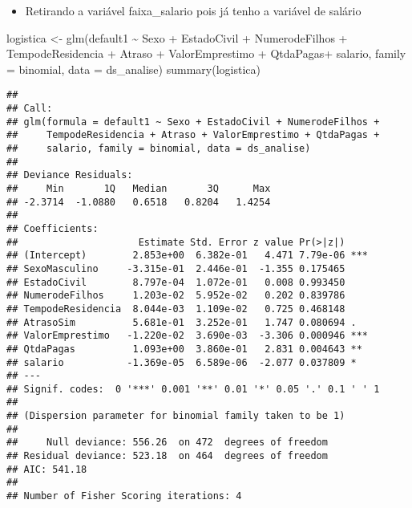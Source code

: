 \documentclass[
]{article}
\newenvironment{Shaded}{\begin{snugshade}}{\end{snugshade}}
\newcommand{\AttributeTok}[1]{\textcolor[rgb]{0.77,0.63,0.00}{#1}}
\newcommand{\FunctionTok}[1]{\textcolor[rgb]{0.00,0.00,0.00}{#1}}
\newcommand{\NormalTok}[1]{#1}
\newcommand{\OtherTok}[1]{\textcolor[rgb]{0.56,0.35,0.01}{#1}}
\newcommand{\SpecialCharTok}[1]{\textcolor[rgb]{0.00,0.00,0.00}{#1}}
\providecommand{\tightlist}{%
  \setlength{\itemsep}{0pt}\setlength{\parskip}{0pt}}
\begin{document}
\begin{itemize}
\tightlist
\item
  Retirando a variável faixa\_salario pois já tenho a variável de
  salário
\end{itemize}

\begin{Shaded}
\begin{Highlighting}[]
\NormalTok{logistica }\OtherTok{\textless{}{-}} \FunctionTok{glm}\NormalTok{(default1 }\SpecialCharTok{\textasciitilde{}}\NormalTok{ Sexo }\SpecialCharTok{+} 
\NormalTok{                            EstadoCivil }\SpecialCharTok{+} 
\NormalTok{                            NumerodeFilhos }\SpecialCharTok{+} 
\NormalTok{                            TempodeResidencia }\SpecialCharTok{+}
\NormalTok{                            Atraso }\SpecialCharTok{+} 
\NormalTok{                            ValorEmprestimo }\SpecialCharTok{+}
\NormalTok{                            QtdaPagas}\SpecialCharTok{+} 
\NormalTok{                            salario, }\AttributeTok{family =}\NormalTok{ binomial, }\AttributeTok{data =}\NormalTok{ ds\_analise)}
\FunctionTok{summary}\NormalTok{(logistica)}
\end{Highlighting}
\end{Shaded}

\begin{verbatim}
## 
## Call:
## glm(formula = default1 ~ Sexo + EstadoCivil + NumerodeFilhos + 
##     TempodeResidencia + Atraso + ValorEmprestimo + QtdaPagas + 
##     salario, family = binomial, data = ds_analise)
## 
## Deviance Residuals: 
##     Min       1Q   Median       3Q      Max  
## -2.3714  -1.0880   0.6518   0.8204   1.4254  
## 
## Coefficients:
##                     Estimate Std. Error z value Pr(>|z|)    
## (Intercept)        2.853e+00  6.382e-01   4.471 7.79e-06 ***
## SexoMasculino     -3.315e-01  2.446e-01  -1.355 0.175465    
## EstadoCivil        8.797e-04  1.072e-01   0.008 0.993450    
## NumerodeFilhos     1.203e-02  5.952e-02   0.202 0.839786    
## TempodeResidencia  8.044e-03  1.109e-02   0.725 0.468148    
## AtrasoSim          5.681e-01  3.252e-01   1.747 0.080694 .  
## ValorEmprestimo   -1.220e-02  3.690e-03  -3.306 0.000946 ***
## QtdaPagas          1.093e+00  3.860e-01   2.831 0.004643 ** 
## salario           -1.369e-05  6.589e-06  -2.077 0.037809 *  
## ---
## Signif. codes:  0 '***' 0.001 '**' 0.01 '*' 0.05 '.' 0.1 ' ' 1
## 
## (Dispersion parameter for binomial family taken to be 1)
## 
##     Null deviance: 556.26  on 472  degrees of freedom
## Residual deviance: 523.18  on 464  degrees of freedom
## AIC: 541.18
## 
## Number of Fisher Scoring iterations: 4
\end{verbatim}
\end{document}
